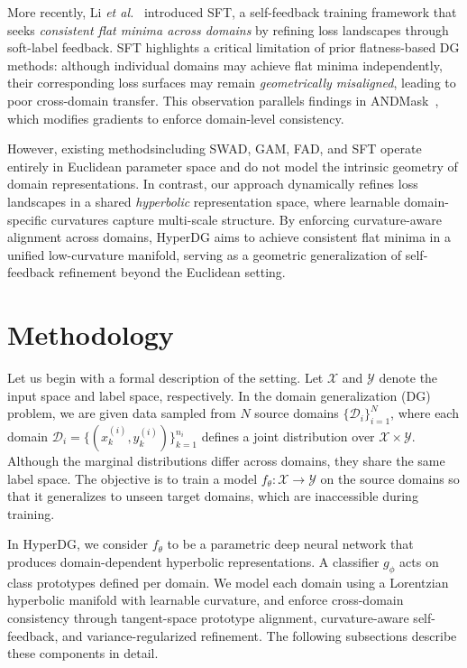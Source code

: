 \documentclass[10pt]{article} %
\begin{document}
More recently, Li \textit{et al.}~\cite{li2025seeking} introduced SFT, a self-feedback training framework that seeks \textit{consistent flat minima across domains} by refining loss landscapes through soft-label feedback.  
SFT highlights a critical limitation of prior flatness-based DG methods: although individual domains may achieve flat minima independently, their corresponding loss surfaces may remain \emph{geometrically misaligned}, leading to poor cross-domain transfer. 
This observation parallels findings in ANDMask~\cite{parascandolo2020learning}, which modifies gradients to enforce domain-level consistency.

However, existing methodsincluding SWAD, GAM, FAD, and SFT operate entirely in Euclidean parameter space and do not model the intrinsic geometry of domain representations.  
In contrast, our approach dynamically refines loss landscapes in a shared \textit{hyperbolic} representation space, where learnable domain-specific curvatures capture multi-scale structure.  
By enforcing curvature-aware alignment across domains, HyperDG aims to achieve consistent flat minima in a unified low-curvature manifold, serving as a geometric generalization of self-feedback refinement beyond the Euclidean setting.


\section{Methodology}
\label{sec:method}

Let us begin with a formal description of the setting. Let $\mathcal{X}$ and $\mathcal{Y}$ denote the input space and label space, respectively. In the domain generalization (DG) problem, we are given data sampled from $N$ source
domains $\{\mathcal{D}_i\}_{i=1}^{N}$, where each domain $\mathcal{D}_i = \{(x^{(i)}_k, y^{(i)}_k)\}_{k=1}^{n_i}$ defines a joint distribution over $\mathcal{X}\times\mathcal{Y}$. Although the marginal distributions differ
across domains, they share the same label space. The objective is to train a model $f_\theta : \mathcal{X} \rightarrow \mathcal{Y}$ on the source domains so that it generalizes to unseen target domains, which are inaccessible during training.

In HyperDG, we consider $f_\theta$ to be a parametric deep neural network that produces domain-dependent hyperbolic representations. A classifier $g_\phi$ acts on class prototypes defined per domain. We model each domain using a Lorentzian hyperbolic manifold with learnable curvature, and enforce cross-domain consistency through tangent-space prototype alignment, curvature-aware self-feedback, and variance-regularized refinement. The following subsections describe these components in detail.
\end{document}
